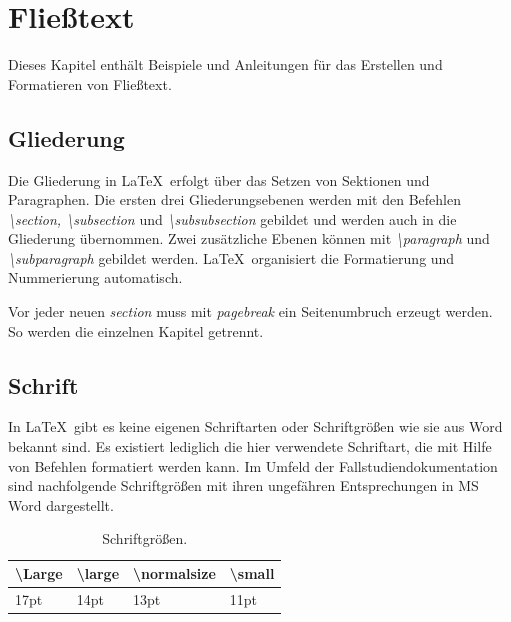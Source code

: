 \documentclass[13pt,a4paper, listof=entryprefix, bibliography=totocnumbered,toc=listofnumbered,lof=listofnumbered]{scrartcl}
\begin{document}
\pagebreak

\section{Flie{\ss}text}
\label{ch:fliesstext}
Dieses Kapitel enthält Beispiele und Anleitungen für das Erstellen und Formatieren von Fließtext.

\subsection{Gliederung}
\label{ch:Gliederung}
Die Gliederung in \LaTeX \ erfolgt über das Setzen von Sektionen und Paragraphen. Die ersten drei Gliederungsebenen werden mit den Befehlen \textit{\textbackslash section, \textbackslash subsection} und \textit{\textbackslash subsubsection} gebildet und werden auch in die Gliederung übernommen. Zwei zusätzliche Ebenen können mit \textit{\textbackslash paragraph} und \textit{\textbackslash subparagraph} gebildet werden. \LaTeX \ organisiert die Formatierung und Nummerierung automatisch.

Vor jeder neuen \textit{section} muss mit \textit{pagebreak} ein Seitenumbruch erzeugt werden. So werden die einzelnen Kapitel getrennt.

\subsection{Schrift}
\label{ch:schrift}
In \LaTeX \ gibt es keine eigenen Schriftarten oder Schriftgrößen wie sie aus Word bekannt sind. Es existiert lediglich die hier verwendete Schriftart, die mit Hilfe von Befehlen formatiert werden kann. Im Umfeld der Fallstudiendokumentation sind nachfolgende Schriftgrößen mit ihren ungefähren Entsprechungen in MS Word dargestellt.

\begin{table}[H]
	\centering
	\begin{tabular}{|l|l|l|l|}
		\hline  \textbackslash Large & \textbackslash large & \textbackslash normalsize & \textbackslash small \\
		\hline  17pt                 & 14pt                 & 13pt                      & 11pt                 \\
		\hline
	\end{tabular}
	\caption{Schriftgrößen.} %
	\label{tab:schriftgroessen}
\end{table}
\end{document}
